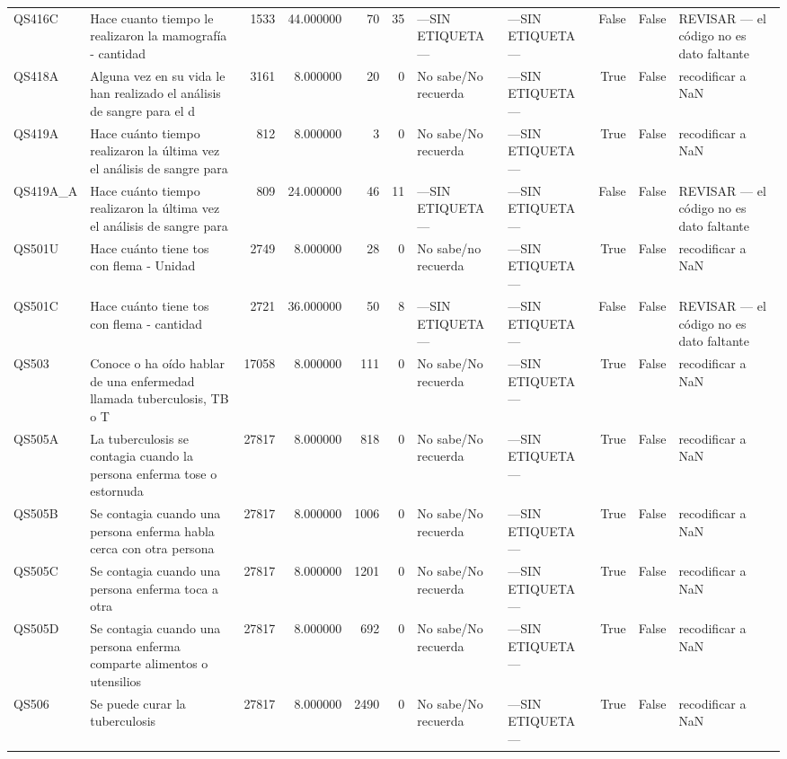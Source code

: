 \begin{longtable}{llrrrrllrrl}
QS416C & Hace cuanto tiempo le realizaron la mamografía - cantidad & 1533 & 44.000000 & 70 & 35 & —SIN ETIQUETA— & —SIN ETIQUETA— & False & False & REVISAR — el código no es dato faltante \\
QS418A & Alguna vez en su vida le han realizado el análisis de sangre para el d & 3161 & 8.000000 & 20 & 0 & No sabe/No recuerda & —SIN ETIQUETA— & True & False & recodificar a NaN \\
QS419A & Hace cuánto tiempo realizaron la última vez el análisis de sangre para & 812 & 8.000000 & 3 & 0 & No sabe/No recuerda & —SIN ETIQUETA— & True & False & recodificar a NaN \\
QS419A\_A & Hace cuánto tiempo realizaron la última vez el análisis de sangre para & 809 & 24.000000 & 46 & 11 & —SIN ETIQUETA— & —SIN ETIQUETA— & False & False & REVISAR — el código no es dato faltante \\
QS501U & Hace cuánto tiene tos con flema - Unidad & 2749 & 8.000000 & 28 & 0 & No sabe/no recuerda & —SIN ETIQUETA— & True & False & recodificar a NaN \\
QS501C & Hace cuánto tiene tos con flema - cantidad & 2721 & 36.000000 & 50 & 8 & —SIN ETIQUETA— & —SIN ETIQUETA— & False & False & REVISAR — el código no es dato faltante \\
QS503 & Conoce o ha oído hablar de una enfermedad llamada tuberculosis, TB o T & 17058 & 8.000000 & 111 & 0 & No sabe/No recuerda & —SIN ETIQUETA— & True & False & recodificar a NaN \\
QS505A & La tuberculosis se contagia cuando la persona enferma tose o estornuda & 27817 & 8.000000 & 818 & 0 & No sabe/No recuerda & —SIN ETIQUETA— & True & False & recodificar a NaN \\
QS505B & Se contagia cuando una persona enferma habla cerca con otra persona & 27817 & 8.000000 & 1006 & 0 & No sabe/No recuerda & —SIN ETIQUETA— & True & False & recodificar a NaN \\
QS505C & Se contagia cuando una persona enferma toca a otra & 27817 & 8.000000 & 1201 & 0 & No sabe/No recuerda & —SIN ETIQUETA— & True & False & recodificar a NaN \\
QS505D & Se contagia cuando una persona enferma comparte alimentos o utensilios & 27817 & 8.000000 & 692 & 0 & No sabe/No recuerda & —SIN ETIQUETA— & True & False & recodificar a NaN \\
QS506 & Se puede curar la tuberculosis & 27817 & 8.000000 & 2490 & 0 & No sabe/No recuerda & —SIN ETIQUETA— & True & False & recodificar a NaN \\

\end{longtable}

